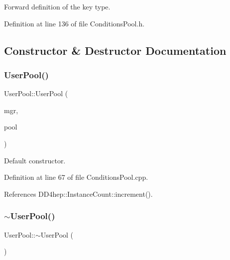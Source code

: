 Forward definition of the key type. 



Definition at line 136 of file Conditions\+Pool.\+h.



\subsection{Constructor \& Destructor Documentation}
\hypertarget{class_d_d4hep_1_1_conditions_1_1_user_pool_a70dd3921967ca613fe912e90b3139494}{}\label{class_d_d4hep_1_1_conditions_1_1_user_pool_a70dd3921967ca613fe912e90b3139494} 
\subsubsection{\texorpdfstring{User\+Pool()}{UserPool()}}
{\footnotesize\ttfamily User\+Pool\+::\+User\+Pool (\begin{DoxyParamCaption}\item[{\hyperlink{class_d_d4hep_1_1_conditions_1_1_conditions_manager}{Conditions\+Manager}}]{mgr,  }\item[{\hyperlink{class_d_d4hep_1_1_conditions_1_1_conditions_i_o_v_pool}{Conditions\+I\+O\+V\+Pool} $\ast$}]{pool }\end{DoxyParamCaption})}



Default constructor. 



Definition at line 67 of file Conditions\+Pool.\+cpp.



References D\+D4hep\+::\+Instance\+Count\+::increment().

\hypertarget{class_d_d4hep_1_1_conditions_1_1_user_pool_abc62b1465b8e6f40a57c5a2f9819d7eb}{}\label{class_d_d4hep_1_1_conditions_1_1_user_pool_abc62b1465b8e6f40a57c5a2f9819d7eb} 
\subsubsection{\texorpdfstring{$\sim$\+User\+Pool()}{~UserPool()}}
{\footnotesize\ttfamily User\+Pool\+::$\sim$\+User\+Pool (\begin{DoxyParamCaption}{ }\end{DoxyParamCaption})\hspace{0.3cm}{\ttfamily [virtual]}}



